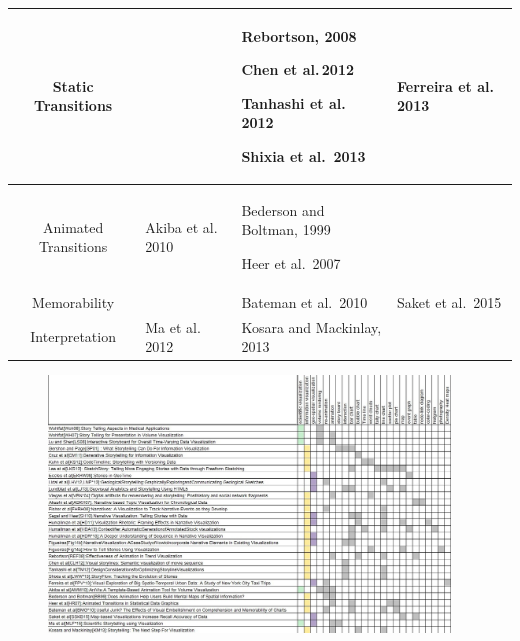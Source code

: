 \documentclass{egpubl}
\begin{document}
\begin{table}[htbp]
\begin{tabular}{c|| p{4cm}| p{5cm}|p{4cm}}
Static Transitions & & Rebortson, 2008\cite{Rebortson} \par  Chen et al.\,2012\cite{chen2012visual} \par Tanhashi et al.\, 2012\cite{Tanahashi} \par Shixia et al.\, 2013\cite{shixia} & Ferreira et al.\, 2013\cite{ferreira2013} \par \\ 
\hline
Animated Transitions & Akiba et al.\, 2010\cite{Akiba} \par & Bederson and Boltman, 1999\cite{bedrson}\par Heer et al.\, 2007 \cite{heer2007} \par &\\
\hline
Memorability & &  Bateman et al.\, 2010\cite{bateman} \par & Saket et al.\, 2015 \cite{saket2015} \par\\ 
\hline
Interpretation &  Ma et al.\, 2012\cite{sci} \par  &  Kosara and Mackinlay, 2013\cite{Kosara} \par & \\
\end{tabular}
\label{table:classification1} 
\end{table}

\begin{figure}
\includegraphics[width=0.95\textwidth]{./images/table2}
\label{table}
\end{figure}
\end{document}
